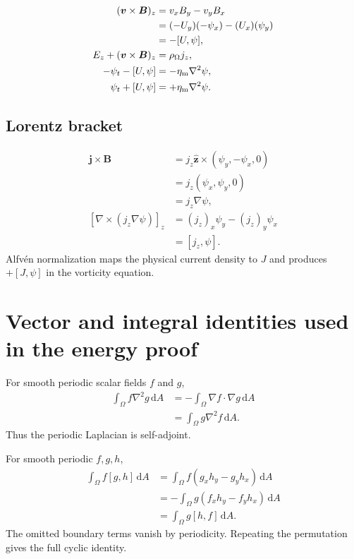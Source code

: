 \documentclass[11pt]{article}
\newcommand{\dd}{\mathrm{d}}
\newcommand{\vect}[1]{\bm{#1}}
\begin{document}
\begin{align}
(\vect{v}\times\vect{B})_z
&=v_xB_y-v_yB_x\\
&=(-U_y)(-\psi_x)-(U_x)(\psi_y)\\
&=-[U,\psi],\\
E_z+(\vect{v}\times\vect{B})_z
&=\rho_\Omega j_z,\\
-\psi_t-[U,\psi]&=-\eta_{\rm m}\nabla^2\psi,\\
\psi_t+[U,\psi]&=+\eta_{\rm m}\nabla^2\psi.
\end{align}

\subsection{Lorentz bracket}

\begin{align}
\vect{j}\times\vect{B}
&=j_z\widehat{\vect{z}}\times(\psi_y,-\psi_x,0)\\
&=j_z(\psi_x,\psi_y,0)\\
&=j_z\nabla\psi,\\
[\nabla\times(j_z\nabla\psi)]_z
&=(j_z)_x\psi_y-(j_z)_y\psi_x\\
&=[j_z,\psi].
\end{align}
Alfv\'en normalization maps the physical current density to $J$ and produces $+[J,\psi]$ in the vorticity equation.

\section{Vector and integral identities used in the energy proof}
\label{app:identities}

For smooth periodic scalar fields $f$ and $g$,
\begin{align}
\int_\Omega f\nabla^2g\,\dd A
&=-\int_\Omega\nabla f\cdot\nabla g\,\dd A\\
&=\int_\Omega g\nabla^2f\,\dd A.
\end{align}
Thus the periodic Laplacian is self-adjoint.

For smooth periodic $f,g,h$,
\begin{align}
\int_\Omega f[g,h]\,\dd A
&=\int_\Omega f(g_xh_y-g_yh_x)\,\dd A\\
&=-\int_\Omega g\left(f_xh_y-f_yh_x\right)\,\dd A\\
&=\int_\Omega g[h,f]\,\dd A.
\end{align}
The omitted boundary terms vanish by periodicity. Repeating the permutation gives the full cyclic identity.
\end{document}
